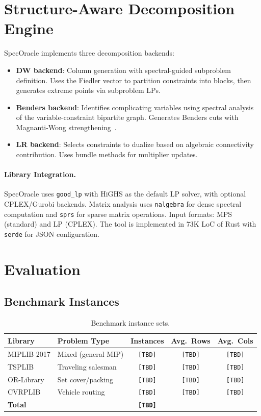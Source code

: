 \documentclass[11pt]{article}
\begin{document}
\section{Structure-Aware Decomposition Engine}
\label{sec:engine}

SpecOracle implements three decomposition backends:

\begin{itemize}
\item \textbf{DW backend}: Column generation with spectral-guided subproblem definition. Uses the Fiedler vector to partition constraints into blocks, then generates extreme points via subproblem LPs.
\item \textbf{Benders backend}: Identifies complicating variables using spectral analysis of the variable-constraint bipartite graph. Generates Benders cuts with Magnanti-Wong strengthening~\cite{magnanti1981}.
\item \textbf{LR backend}: Selects constraints to dualize based on algebraic connectivity contribution. Uses bundle methods for multiplier updates.
\end{itemize}

\paragraph{Library Integration.} SpecOracle uses \texttt{good\_lp} with HiGHS as the default LP solver, with optional CPLEX/Gurobi backends. Matrix analysis uses \texttt{nalgebra} for dense spectral computation and \texttt{sprs} for sparse matrix operations. Input formats: MPS (standard) and LP (CPLEX). The tool is implemented in 73K LoC of Rust with \texttt{serde} for JSON configuration.

\section{Evaluation}
\label{sec:eval}

\subsection{Benchmark Instances}

\begin{table}[t]
\centering
\caption{Benchmark instance sets.}
\begin{tabular}{llccc}
\toprule
\textbf{Library} & \textbf{Problem Type} & \textbf{Instances} & \textbf{Avg.\ Rows} & \textbf{Avg.\ Cols} \\
\midrule
MIPLIB 2017 & Mixed (general MIP) & \texttt{[TBD]} & \texttt{[TBD]} & \texttt{[TBD]} \\
TSPLIB & Traveling salesman & \texttt{[TBD]} & \texttt{[TBD]} & \texttt{[TBD]} \\
OR-Library & Set cover/packing & \texttt{[TBD]} & \texttt{[TBD]} & \texttt{[TBD]} \\
CVRPLIB & Vehicle routing & \texttt{[TBD]} & \texttt{[TBD]} & \texttt{[TBD]} \\
\midrule
\textbf{Total} & & \textbf{\texttt{[TBD]}} & & \\
\bottomrule
\end{tabular}
\end{table}
\end{document}
